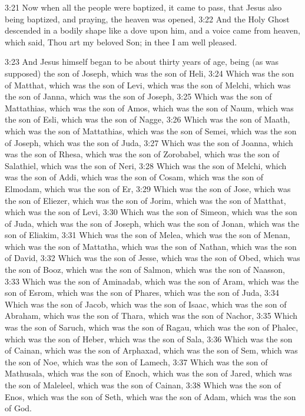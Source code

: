 3:21 Now when all the people were baptized, it came to pass, that
Jesus also being baptized, and praying, the heaven was opened, 3:22
And the Holy Ghost descended in a bodily shape like a dove upon him,
and a voice came from heaven, which said, Thou art my beloved Son; in
thee I am well pleased.

3:23 And Jesus himself began to be about thirty years of age, being
(as was supposed) the son of Joseph, which was the son of Heli, 3:24
Which was the son of Matthat, which was the son of Levi, which was the
son of Melchi, which was the son of Janna, which was the son of
Joseph, 3:25 Which was the son of Mattathias, which was the son of
Amos, which was the son of Naum, which was the son of Esli, which was
the son of Nagge, 3:26 Which was the son of Maath, which was the son
of Mattathias, which was the son of Semei, which was the son of
Joseph, which was the son of Juda, 3:27 Which was the son of Joanna,
which was the son of Rhesa, which was the son of Zorobabel, which was
the son of Salathiel, which was the son of Neri, 3:28 Which was the
son of Melchi, which was the son of Addi, which was the son of Cosam,
which was the son of Elmodam, which was the son of Er, 3:29 Which was
the son of Jose, which was the son of Eliezer, which was the son of
Jorim, which was the son of Matthat, which was the son of Levi, 3:30
Which was the son of Simeon, which was the son of Juda, which was the
son of Joseph, which was the son of Jonan, which was the son of
Eliakim, 3:31 Which was the son of Melea, which was the son of Menan,
which was the son of Mattatha, which was the son of Nathan, which was
the son of David, 3:32 Which was the son of Jesse, which was the son
of Obed, which was the son of Booz, which was the son of Salmon, which
was the son of Naasson, 3:33 Which was the son of Aminadab, which was
the son of Aram, which was the son of Esrom, which was the son of
Phares, which was the son of Juda, 3:34 Which was the son of Jacob,
which was the son of Isaac, which was the son of Abraham, which was
the son of Thara, which was the son of Nachor, 3:35 Which was the son
of Saruch, which was the son of Ragau, which was the son of Phalec,
which was the son of Heber, which was the son of Sala, 3:36 Which was
the son of Cainan, which was the son of Arphaxad, which was the son of
Sem, which was the son of Noe, which was the son of Lamech, 3:37 Which
was the son of Mathusala, which was the son of Enoch, which was the
son of Jared, which was the son of Maleleel, which was the son of
Cainan, 3:38 Which was the son of Enos, which was the son of Seth,
which was the son of Adam, which was the son of God.

